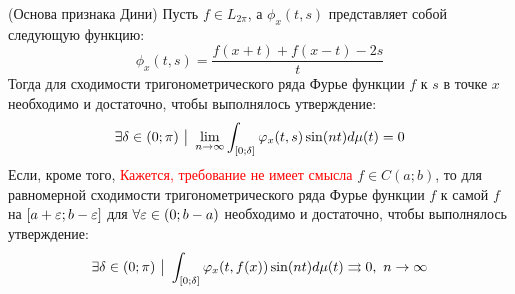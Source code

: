 \begin{lemma} (Основа признака Дини)
	Пусть $f \in L_{2\pi}$, а $\phi_x(t, s)$ представляет собой следующую функцию:
	\[
		\phi_x(t, s) = \frac{f(x + t) + f(x - t) - 2s}{t}
	\]
	Тогда для сходимости тригонометрического ряда Фурье функции $f$ к $s$ в точке $x$ необходимо и достаточно, чтобы выполнялось утверждение:
	\[
		\exists \delta \in (0; \pi) \ \big|\  \lim_{n \to \infty} \int_{[0; \delta]} \varphi_x(t, s)\sin(nt)d\mu(t) = 0
	\]
	Если, кроме того, \textcolor{red}{Кажется, требование не имеет смысла} $f \in C(a; b)$, то для равномерной сходимости тригонометрического ряда Фурье функции $f$ к самой $f$ на $[a + \varepsilon; b - \varepsilon]$ для $\forall \varepsilon \in (0; b - a)$ необходимо и достаточно, чтобы выполнялось утверждение:
	\[
		\exists \delta \in (0; \pi) \ \big|\  \int_{[0; \delta]} \varphi_x(t, f(x))\sin(nt)d\mu(t) \rightrightarrows 0,\ n \to \infty
	\]
\end{lemma}

